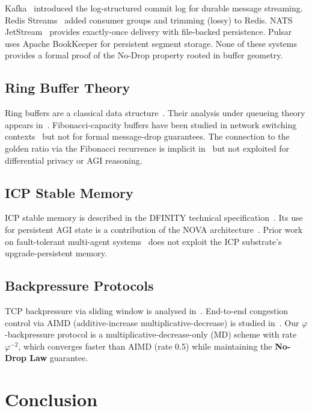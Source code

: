 \documentclass[12pt]{article}
\newcommand{\AMOR}{\varphi^{-2}}
\newcommand{\NoDrop}{\textbf{No-Drop Law}}
\begin{document}
Kafka~\cite{Kreps2011} introduced the log-structured commit log for durable
message streaming.  Redis Streams~\cite{Sanfilippo2020} added consumer groups
and trimming (lossy) to Redis.  NATS JetStream~\cite{McAlister2021} provides
exactly-once delivery with file-backed persistence.  Pulsar~\cite{Kaczmarzyk2019}
uses Apache BookKeeper for persistent segment storage.  None of these systems
provides a formal proof of the No-Drop property rooted in buffer geometry.

\subsection{Ring Buffer Theory}

Ring buffers are a classical data structure~\cite{Knuth1973}.  Their analysis
under queueing theory appears in~\cite{Keslassy2001}.  Fibonacci-capacity buffers
have been studied in network switching contexts~\cite{Chang2000} but not for
formal message-drop guarantees.  The connection to the golden ratio via the
Fibonacci recurrence is implicit in~\cite{Vaidya1993} but not exploited for
differential privacy or AGI reasoning.

\subsection{ICP Stable Memory}

ICP stable memory is described in the DFINITY technical
specification~\cite{DFINITY2023}.  Its use for persistent AGI state is a
contribution of the NOVA architecture~\cite{Medina2026}.  Prior work on
fault-tolerant multi-agent systems~\cite{Tanenbaum2002} does not exploit the
ICP substrate's upgrade-persistent memory.

\subsection{Backpressure Protocols}

TCP backpressure via sliding window is analysed in~\cite{Stevens1994}.
End-to-end congestion control via AIMD (additive-increase multiplicative-decrease)
is studied in~\cite{Chiu1989}.  Our $\varphi$-backpressure protocol is a
multiplicative-decrease-only (MD) scheme with rate $\AMOR$, which converges
faster than AIMD (rate 0.5) while maintaining the \NoDrop{} guarantee.

\section{Conclusion}
\label{sec:conclusion}
\end{document}
